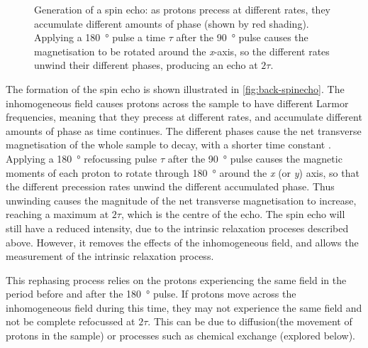 \begin{figure}[t]
\centering
{}
\caption[Generation of a Spin echo]{Generation of a spin echo: as protons precess at different rates, they accumulate different amounts of phase (shown by red shading). Applying a \SI{180}{\degree} pulse a time $\tau$ after the \SI{90}{\degree} pulse causes the magnetisation to be rotated around the \textit{x}-axis, so the different rates unwind their different phases, producing an echo at $2\tau$.}
\label{fig:back-spinecho}
\end{figure}

The formation of the spin echo is shown illustrated in \autoref{fig:back-spinecho}.
The inhomogeneous \Bzero field causes protons across the sample to have different Larmor frequencies, meaning that they precess at different rates, and accumulate different amounts of phase as time continues.
The different phases cause the net transverse magnetisation of the whole sample to decay, with a shorter time constant \Ttwostar.
Applying a \SI{180}{\degree} refocussing pulse $\tau$ after the \SI{90}{\degree} pulse causes the magnetic moments of each proton to rotate through \SI{180}{\degree} around the \textit{x} (or \textit{y}) axis, so that the different precession rates unwind the different accumulated phase.
Thus unwinding causes the magnitude of the net transverse magnetisation to increase, reaching a maximum at $2\tau$, which is the centre of the echo.
The spin echo will still have a reduced intensity, due to the intrinsic \Ttwo relaxation proceses described above.
However, it removes the effects of the inhomogeneous \Bzero field, and allows the measurement of the intrinsic \Ttwo relaxation process.

This rephasing process relies on the protons experiencing the same \Bzero field in the period before and after the \SI{180}{\degree} pulse.
If protons move across the inhomogeneous field during this time, they may not experience the same field and not be complete refocussed at $2\tau$.
This can be due to diffusion(the movement of protons in the sample) or processes such as chemical exchange (explored below).

